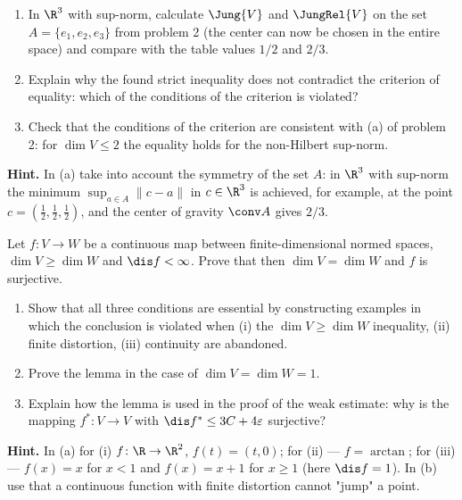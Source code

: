 \documentclass[a4paper,12pt]{report}
\begin{document}
\begin{task}[equality criterion $J(V) = J_s(V)$]
\begin{enumerate}[label=\textup{(\alph*)}]
\item In $\R^3$ with sup-norm, calculate $\Jung{V}$ and $\JungRel{V}$ on the set $A = \{e_1, e_2, e_3\}$ from problem \textup{2} \textup{(}the center can now be chosen in the entire space\textup{)} and compare with the table values $1/2$ and $2/3$.
\item Explain why the found strict inequality does not contradict the criterion of equality\textup{:} which of the conditions of the criterion is violated?
\item Check that the conditions of the criterion are consistent with \textup{(a)} of problem \textup{2}\textup{:} for $\dim V \le 2$ the equality holds for the non-Hilbert sup-norm.
\end{enumerate}

\textbf{Hint.} In \textup{(a)} take into account the symmetry of the set $A$\textup{:} in $\R^3$ with sup-norm the minimum $\sup_{a \in A} \|c - a\|$ in $c \in \R^3$ is achieved, for example, at the point $c = (\frac12, \frac12, \frac12)$, and the center of gravity $\conv A$ gives $2/3$.
\end{task}
\begin{task}
Let $f\colon V \to W$ be a continuous map between finite-dimensional normed spaces, $\dim V \ge \dim W$ and $\dis f < \infty$. Prove that then $\dim V = \dim W$ and $f$ is surjective.

\begin{enumerate}[label=\textup{(\alph*)}]
\item Show that all three conditions are essential by constructing examples in which the conclusion is violated when \textup{(i)} the $\dim V \ge \dim W$ inequality, \textup{(ii)} finite distortion, \textup{(iii)} continuity are abandoned.
\item\label{it:webster_dim1} Prove the lemma in the case of $\dim V = \dim W = 1$.
\item Explain how the lemma is used in the proof of the weak estimate\textup{:} why is the mapping $f^*\colon V \to V$ with $\dis f^* \le 3C + 4\varepsilon$ surjective?
\end{enumerate}

\textbf{Hint.} In \textup{(a)} for \textup{(i)} $f\colon \R \to \R^2$, $f(t) = (t, 0)$\textup{;} for \textup{(ii)} --- $f = \arctan$\textup{;} for \textup{(iii)} --- $f(x) = x$ for $x < 1$ and $f(x) = x + 1$ for $x \ge 1$ \textup{(}here $\dis f = 1$\textup{)}. In \textup{(b)} use that a continuous function with finite distortion cannot "jump" a point.
\end{task}
\end{document}
